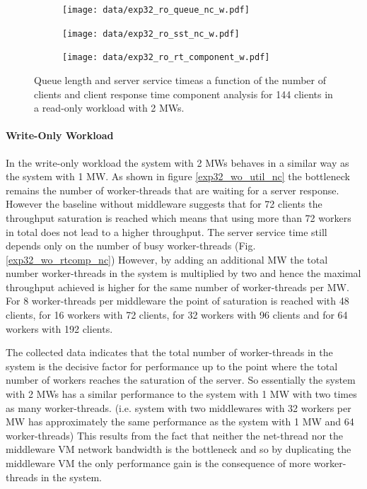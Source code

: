\documentclass[report.tex]{subfiles}
\begin{document}
\begin{figure}[H]
	\begin{subfigure}[b]{.33\linewidth}
		\centering
		\texttt{[image: data/exp32\_ro\_queue\_nc\_w.pdf]}
		\caption{}\label{exp32_ro_q}
	\end{subfigure}\hfill
	\begin{subfigure}[b]{.33\linewidth}
		\centering
		\texttt{[image: data/exp32\_ro\_sst\_nc\_w.pdf]}
		\caption{}\label{exp32_ro_sst}
	\end{subfigure}\hfill
	\begin{subfigure}[b]{.33\linewidth}
		\centering
		\texttt{[image: data/exp32\_ro\_rt\_component\_w.pdf]}
		\caption{}\label{exp32_ro_rtcomp}
	\end{subfigure}
	\caption{Queue length and server service timeas a function of the number of clients and client response time component analysis for 144 clients  in a read-only workload with 2 MWs.}
\end{figure}
\vspace{-8mm}
\paragraph{Write-Only Workload}

In the write-only workload the system with 2 MWs behaves in a similar way as the system with 1 MW. 
As shown in figure \ref{exp32_wo_util_nc} the bottleneck remains the number of worker-threads that are waiting for a server response. 
However the baseline without middleware suggests that for 72 clients the throughput saturation is reached which means that using more than 72 workers in total does not lead to a higher throughput.
The server service time still depends only on the number of busy worker-threads (Fig. \ref{exp32_wo_rtcomp_nc})
However, by adding an additional MW the total number worker-threads in the system is multiplied by two and hence the maximal throughput achieved is higher for the same number of worker-threads per MW.
For 8 worker-threads per middleware the point of saturation is reached with 48 clients, for 16 workers with 72 clients, for 32 workers with 96 clients and for 64 workers with 192 clients.

The collected data indicates that the total number of worker-threads in the system is the decisive factor for performance up to the point where the total number of workers reaches the saturation of the server.
So essentially the system with 2 MWs has a similar performance to the system with 1 MW with two times as many worker-threads. (i.e. system with two middlewares with 32 workers per MW has approximately the same performance as the system with 1 MW and 64 worker-threads)
This results from the fact that neither the net-thread nor the middleware VM network bandwidth is the bottleneck and so by duplicating the middleware VM the only performance gain is the consequence of more worker-threads in the system.
\end{document}

